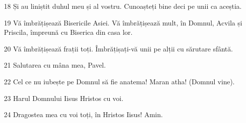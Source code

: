 \par 18 Și au liniștit duhul meu și al vostru. Cunoașteți bine deci pe unii ca aceștia.
\par 19 Vă îmbrățișează Bisericile Asiei. Vă îmbrățișează mult, în Domnul, Acvila și Priscila, împreună cu Biserica din casa lor.
\par 20 Vă îmbrățișează frații toți. Îmbrățișați-vă unii pe alții cu sărutare sfântă.
\par 21 Salutarea cu mâna mea, Pavel.
\par 22 Cel ce nu iubește pe Domnul să fie anatema! Maran atha! (Domnul vine).
\par 23 Harul Domnului Iisus Hristos cu voi.
\par 24 Dragostea mea cu voi toți, în Hristos Iisus! Amin.


